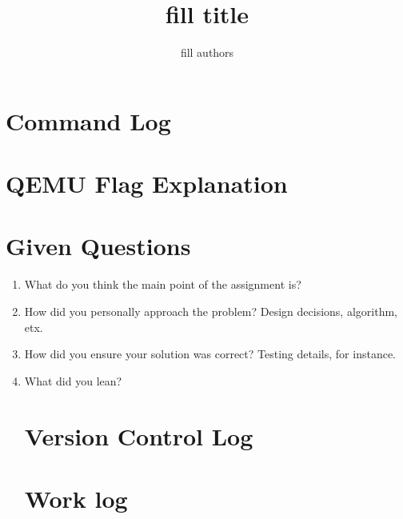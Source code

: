 \documentclass[12pt]{article}
\title{fill title}
\author{fill authors}
\begin{document}
\maketitle
\tableofcontents

\section{Command Log}

\section{QEMU Flag Explanation}

\section{Given Questions}
\begin{enumerate}
\item{What do you think the main point of the assignment is?}

\item{How did you personally approach the problem? Design decisions, algorithm, etx.}

\item{How did you ensure your solution was correct? Testing details, for instance.}

\item{What did you lean?} 

\section{Version Control Log}

\section{Work log}

\end{enumerate}
\end{document}
